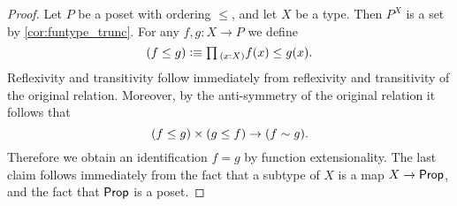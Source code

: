\begin{proof}
  Let $P$ be a poset with ordering $\leq$, and let $X$ be a type. Then $P^X$ is a set by \cref{cor:funtype_trunc}. For any $f,g:X\to P$ we define
  \begin{equation*}
    (f\leq g) \defeq \prd{x:X}f(x)\leq g(x).
  \end{equation*}
  Reflexivity and transitivity follow immediately from reflexivity and transitivity of the original relation. Moreover, by the anti-symmetry of the original relation it follows that
  \begin{equation*}
    (f\leq g)\times (g\leq f) \to (f\sim g). 
  \end{equation*}
  Therefore we obtain an identification $f=g$ by function extensionality. The last claim follows immediately from the fact that a subtype of $X$ is a map $X\to\mathsf{Prop}$, and the fact that $\mathsf{Prop}$ is a poset.
\end{proof}

